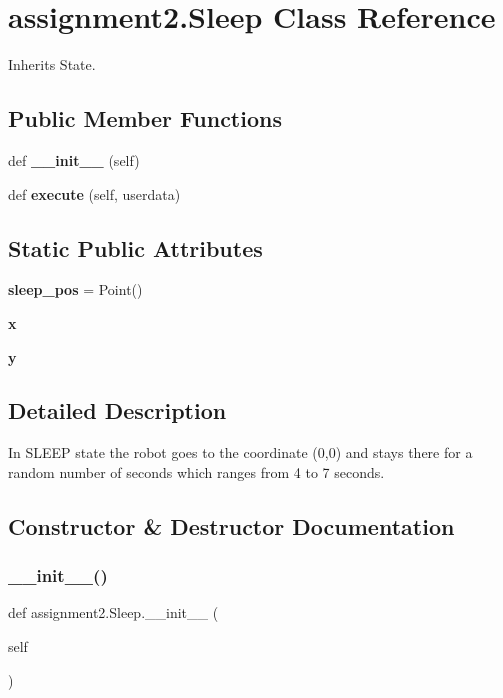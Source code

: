 \section{assignment2.\+Sleep Class Reference}
\label{classassignment2_1_1_sleep}


Inherits State.

\subsection*{Public Member Functions}
\begin{DoxyCompactItemize}
\item 
def \textbf{ \+\_\+\+\_\+init\+\_\+\+\_\+} (self)
\item 
def \textbf{ execute} (self, userdata)
\end{DoxyCompactItemize}
\subsection*{Static Public Attributes}
\begin{DoxyCompactItemize}
\item 
\textbf{ sleep\+\_\+pos} = Point()
\item 
\textbf{ x}
\item 
\textbf{ y}
\end{DoxyCompactItemize}


\subsection{Detailed Description}
\begin{DoxyVerb}In SLEEP state the robot goes to the coordinate (0,0) and stays there for a random number of seconds which ranges from 4 to 7 seconds.
\end{DoxyVerb}
 

\subsection{Constructor \& Destructor Documentation}
\mbox{\label{classassignment2_1_1_sleep_a952be02197074c6b8fe50ba57592a639}} 
\subsubsection{\+\_\+\+\_\+init\+\_\+\+\_\+()}
{\footnotesize\ttfamily def assignment2.\+Sleep.\+\_\+\+\_\+init\+\_\+\+\_\+ (\begin{DoxyParamCaption}\item[{}]{self }\end{DoxyParamCaption})}


